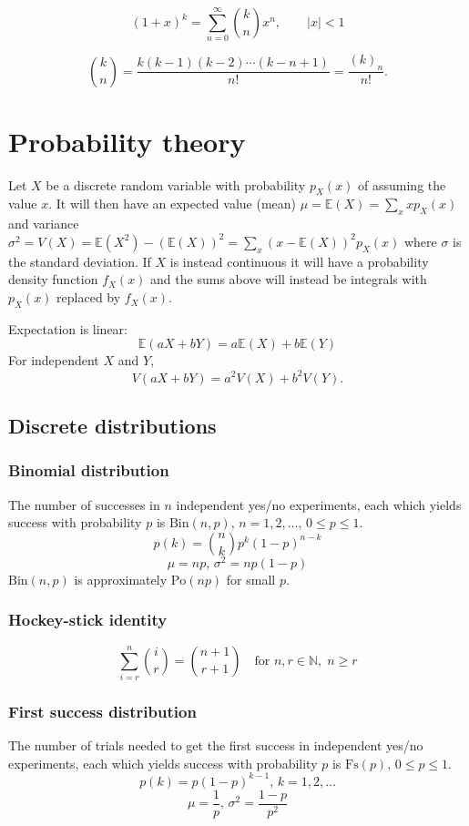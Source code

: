 \[
(1+x)^k 
= \sum_{n=0}^{\infty} \binom{k}{n} x^n, 
\qquad |x| < 1
\]

\[
\binom{k}{n} 
= \frac{k(k-1)(k-2)\cdots(k-n+1)}{n!}
= \frac{(k)_n}{n!}.
\]

\section{Probability theory}
Let $X$ be a discrete random variable with probability $p_X(x)$ of assuming the value $x$. It will then have an expected value (mean) $\mu=\mathbb{E}(X)=\sum_xxp_X(x)$ and variance $\sigma^2=V(X)=\mathbb{E}(X^2)-(\mathbb{E}(X))^2=\sum_x(x-\mathbb{E}(X))^2p_X(x)$ where $\sigma$ is the standard deviation. If $X$ is instead continuous it will have a probability density function $f_X(x)$ and the sums above will instead be integrals with $p_X(x)$ replaced by $f_X(x)$.

Expectation is linear:
\[\mathbb{E}(aX+bY) = a\mathbb{E}(X)+b\mathbb{E}(Y)\]
For independent $X$ and $Y$, \[V(aX+bY) = a^2V(X)+b^2V(Y).\]

\subsection{Discrete distributions}

\subsubsection{Binomial distribution}
The number of successes in $n$ independent yes/no experiments, each which yields success with probability $p$ is $\textrm{Bin}(n,p),\,n=1,2,\dots,\, 0\leq p\leq1$.
\[p(k)=\binom{n}{k}p^k(1-p)^{n-k}\]
\[\mu = np,\,\sigma^2=np(1-p)\]
$\textrm{Bin}(n,p)$ is approximately $\textrm{Po}(np)$ for small $p$.

\subsubsection{Hockey-stick identity}
\[\sum_{i = r}^{n} \binom{i}{r} = \binom{n + 1}{r + 1}\quad \text{for } n, r \in \mathbb{N}, \; n \ge r\]

\subsubsection{First success distribution}
The number of trials needed to get the first success in independent yes/no experiments, each which yields success with probability $p$ is $\textrm{Fs}(p),\,0\leq p\leq1$.
\[p(k)=p(1-p)^{k-1},\,k=1,2,\dots\]
\[\mu = \frac1p,\,\sigma^2=\frac{1-p}{p^2}\]

